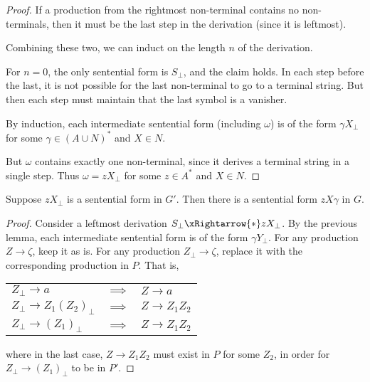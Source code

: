 \documentclass[12pt]{article}
\begin{document}
\begin{solution}
\begin{proof}
        If a production from the rightmost non-terminal contains no
        non-terminals, then it must be the last step in the derivation
        (since it is leftmost).

        Combining these two, we can induct on the length $n$ of the
        derivation.

        For $n = 0$, the only sentential form is $S_\bot$,
        and the claim holds.
        In each step before the last, it is not possible for the last
        non-terminal to go to a terminal string.
        But then each step must maintain that the last symbol is a
        vanisher.

        By induction, each intermediate sentential form (including $\omega$)
        is of the form $\gamma X_\bot$ for some $\gamma \in (A \cup N)^*$
        and $X \in N$.

        But $\omega$ contains exactly one non-terminal, since
        it derives a terminal string in a single step.
        Thus $\omega = z X_\bot$ for some $z \in A^*$ and $X \in N$.
    \end{proof}

    \begin{lemma} \label{thm:reverse}
        Suppose $z X_\bot$ is a sentential form in $G'$.
        Then there is a sentential form $zX\gamma$ in $G$.
    \end{lemma}
    \begin{proof}
        Consider a leftmost derivation $S_\bot \xRightarrow{*} zX_\bot$.
        By the previous lemma, each intermediate sentential form is of the
        form $\gamma Y_\bot$.
        For any production $Z \to \zeta$, keep it as is.
        For any production $Z_\bot \to \zeta$, replace it with the
        corresponding production in $P$.
        That is,
        \begin{center}
            \begin{tabular}{lcl}
                $Z_\bot \to a$ & $\implies$ & $Z \to a$ \\
                $Z_\bot \to Z_1 (Z_2)_\bot$ & $\implies$ & $Z \to Z_1 Z_2$
                    \\
                $Z_\bot \to (Z_1)_\bot$ & $\implies$ & $Z \to Z_1 Z_2$
            \end{tabular}
        \end{center}
        where in the last case,
        $Z \to Z_1 Z_2$ must exist in $P$ for some $Z_2$,
        in order for $Z_\bot \to (Z_1)_\bot$ to be in $P'$.


\end{proof}
\end{solution}
\end{document}
